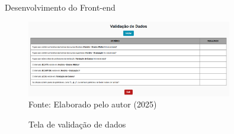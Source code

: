 \begin{frame}{Desenvolvimento do Front-end}
    \begin{figure}
        \centering
        \vspace{-0.5cm}
        \caption{Tela de validação de dados}
        \vspace{-0.2cm}
        \includegraphics[width=0.8\textwidth]{figuras/front-10.png}
        \\ %
        \small Fonte: Elaborado pelo autor (2025)
    \end{figure}
\end{frame}

